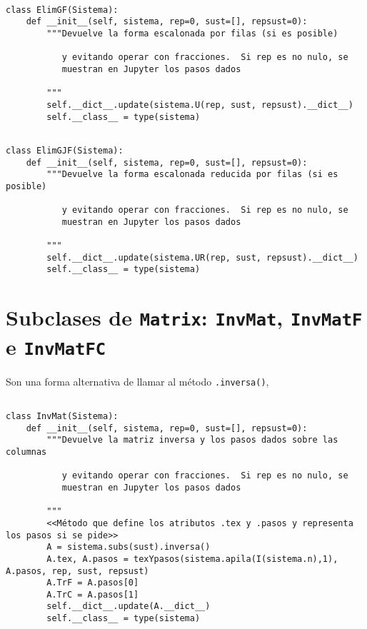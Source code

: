 \documentclass[11pt]{report}
\begin{document}
\begin{verbatim}

class ElimGF(Sistema):
    def __init__(self, sistema, rep=0, sust=[], repsust=0):
        """Devuelve la forma escalonada por filas (si es posible)

           y evitando operar con fracciones.  Si rep es no nulo, se
           muestran en Jupyter los pasos dados

        """        
        self.__dict__.update(sistema.U(rep, sust, repsust).__dict__)
        self.__class__ = type(sistema)

\end{verbatim}


\begin{verbatim}

class ElimGJF(Sistema):
    def __init__(self, sistema, rep=0, sust=[], repsust=0):
        """Devuelve la forma escalonada reducida por filas (si es posible)

           y evitando operar con fracciones.  Si rep es no nulo, se
           muestran en Jupyter los pasos dados

        """        
        self.__dict__.update(sistema.UR(rep, sust, repsust).__dict__)
        self.__class__ = type(sistema)

\end{verbatim}

\section{Subclases de \texttt{Matrix}: \texttt{InvMat}, \texttt{InvMatF} e \texttt{InvMatFC}}
\label{sec:orgf8140da}
Son una forma alternativa de llamar al método \texttt{.inversa()},

\begin{verbatim}

class InvMat(Sistema):
    def __init__(self, sistema, rep=0, sust=[], repsust=0):
        """Devuelve la matriz inversa y los pasos dados sobre las columnas

           y evitando operar con fracciones.  Si rep es no nulo, se
           muestran en Jupyter los pasos dados

        """
        <<Método que define los atributos .tex y .pasos y representa los pasos si se pide>>
        A = sistema.subs(sust).inversa()
        A.tex, A.pasos = texYpasos(sistema.apila(I(sistema.n),1), A.pasos, rep, sust, repsust)
        A.TrF = A.pasos[0]
        A.TrC = A.pasos[1]
        self.__dict__.update(A.__dict__)
        self.__class__ = type(sistema)

\end{verbatim}
\end{document}
